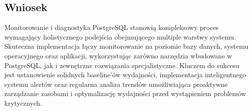 \documentclass[a4paper,11pt,openany,english]{sphinxmanual}
\begin{document}
\subsection{Wniosek}
\label{\detokenize{rozdzial2/Monitorowanie-i-diagnostyka/index:wniosek}}
\sphinxAtStartPar
Monitorowanie i diagnostyka PostgreSQL stanowią kompleksowy proces wymagający holistycznego podejścia obejmującego multiple warstwy systemu. Skuteczna implementacja łączy monitorowanie na poziomie bazy danych, systemu operacyjnego oraz aplikacji, wykorzystując zarówno narzędzia wbudowane w PostgreSQL, jak i zewnętrzne rozwiązania specjalistyczne. Kluczem do sukcesu jest ustanowienie solidnych baseline’ów wydajności, implementacja inteligentnego systemu alertów oraz regularna analiza trendów umożliwiająca proaktywne zarządzanie zasobami i optymalizację wydajności przed wystąpieniem problemów krytycznych.
\end{document}
